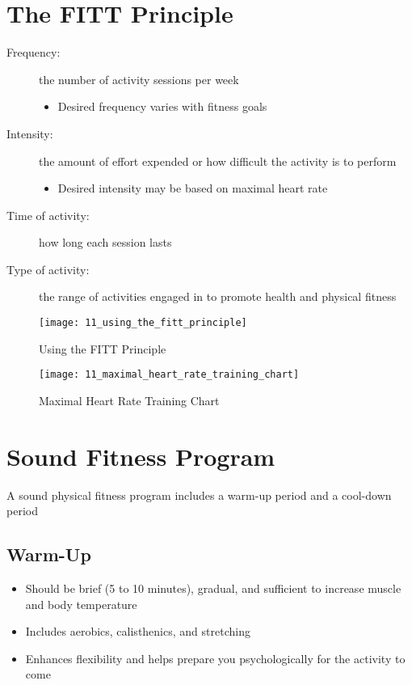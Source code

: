 \documentclass[title={Chapter 11}]{fdsn201notes}
\begin{document}
\section{The FITT Principle}\label{sec:the-fitt-principle}
\begin{description}
	\item[Frequency:] the number of activity sessions per week
	\begin{itemize}
		\item Desired frequency varies with fitness goals
	\end{itemize}
	\item[Intensity:] the amount of effort expended or how difficult the activity is to perform
	\begin{itemize}
		\item Desired intensity may be based on maximal heart rate
	\end{itemize}
	\item[Time of activity:] how long each session lasts
	\item[Type of activity:] the range of activities engaged in to promote health and physical fitness
\end{description}

\begin{figure}[H]
	\centering
	\texttt{[image: 11\_using\_the\_fitt\_principle]}
	\caption{Using the FITT Principle}
	\label{fig:using-the-fitt-principle}
\end{figure}

\begin{figure}[H]
	\centering
	\texttt{[image: 11\_maximal\_heart\_rate\_training\_chart]}
	\caption{Maximal Heart Rate Training Chart}
	\label{fig:maximal-heart-rate-training-chart}
\end{figure}

\section{Sound Fitness Program}\label{sec:sound-fitness-program-2}
A sound physical fitness program includes a warm-up period and a cool-down period

\subsection{Warm-Up}\label{subsec:warm-up}
\begin{itemize}
	\item Should be brief (5 to 10 minutes), gradual, and sufficient to increase muscle and body temperature
	\item Includes aerobics, calisthenics, and stretching
	\item Enhances flexibility and helps prepare you psychologically for the activity to come
\end{itemize}
\end{document}
